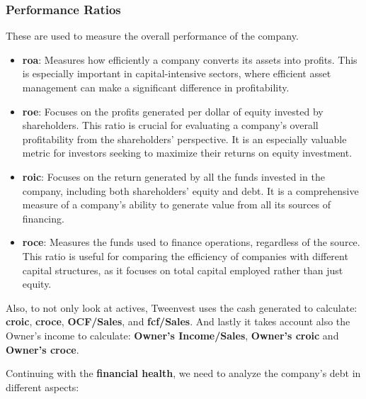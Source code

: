 \documentclass[11pt,english,a4paper,hidelinks]{book}
\begin{document}
\subsubsection{Performance Ratios}
These are used to measure the overall performance of the company.
\begin{itemize}
    \item \textbf{\acrshort{roa}}: Measures how efficiently a company converts its assets into profits. This is especially important in capital-intensive sectors, where efficient asset management can make a significant difference in profitability.
    
    \item \textbf{\acrshort{roe}}: Focuses on the profits generated per dollar of equity invested by shareholders. This ratio is crucial for evaluating a company's overall profitability from the shareholders' perspective. It is an especially valuable metric for investors seeking to maximize their returns on equity investment.
    
    \item \textbf{\acrshort{roic}}: Focuses on the return generated by all the funds invested in the company, including both shareholders' equity and debt. It is a comprehensive measure of a company's ability to generate value from all its sources of financing.
    
    \item \textbf{\acrshort{roce}}: Measures the funds used to finance operations, regardless of the source. This ratio is useful for comparing the efficiency of companies with different capital structures, as it focuses on total capital employed rather than just equity.
\end{itemize}

\noindent Also, to not only look at actives, Tweenvest uses the cash generated to calculate: \textbf{\acrshort{croic}}, \textbf{\acrshort{croce}}, \textbf{OCF/Sales}, and \textbf{\acrshort{fcf}/Sales}. And lastly it takes account also the Owner's income to calculate: \textbf{Owner's Income/Sales}, \textbf{Owner's \acrshort{croic}} and \textbf{Owner's \acrshort{croce}}.

\vspace{0.5cm}
\noindent Continuing with the \textbf{financial health}, we need to analyze the company's debt in different aspects:
\end{document}
